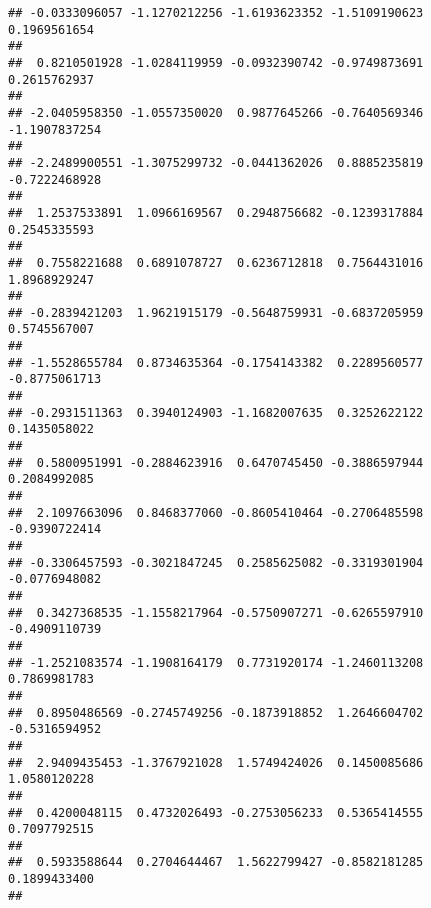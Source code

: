 \documentclass[]{article}
\begin{document}
\begin{verbatim}
## -0.0333096057 -1.1270212256 -1.6193623352 -1.5109190623  0.1969561654 
##                                                                       
##  0.8210501928 -1.0284119959 -0.0932390742 -0.9749873691  0.2615762937 
##                                                                       
## -2.0405958350 -1.0557350020  0.9877645266 -0.7640569346 -1.1907837254 
##                                                                       
## -2.2489900551 -1.3075299732 -0.0441362026  0.8885235819 -0.7222468928 
##                                                                       
##  1.2537533891  1.0966169567  0.2948756682 -0.1239317884  0.2545335593 
##                                                                       
##  0.7558221688  0.6891078727  0.6236712818  0.7564431016  1.8968929247 
##                                                                       
## -0.2839421203  1.9621915179 -0.5648759931 -0.6837205959  0.5745567007 
##                                                                       
## -1.5528655784  0.8734635364 -0.1754143382  0.2289560577 -0.8775061713 
##                                                                       
## -0.2931511363  0.3940124903 -1.1682007635  0.3252622122  0.1435058022 
##                                                                       
##  0.5800951991 -0.2884623916  0.6470745450 -0.3886597944  0.2084992085 
##                                                                       
##  2.1097663096  0.8468377060 -0.8605410464 -0.2706485598 -0.9390722414 
##                                                                       
## -0.3306457593 -0.3021847245  0.2585625082 -0.3319301904 -0.0776948082 
##                                                                       
##  0.3427368535 -1.1558217964 -0.5750907271 -0.6265597910 -0.4909110739 
##                                                                       
## -1.2521083574 -1.1908164179  0.7731920174 -1.2460113208  0.7869981783 
##                                                                       
##  0.8950486569 -0.2745749256 -0.1873918852  1.2646604702 -0.5316594952 
##                                                                       
##  2.9409435453 -1.3767921028  1.5749424026  0.1450085686  1.0580120228 
##                                                                       
##  0.4200048115  0.4732026493 -0.2753056233  0.5365414555  0.7097792515 
##                                                                       
##  0.5933588644  0.2704644467  1.5622799427 -0.8582181285  0.1899433400 
##                                                                       

\end{verbatim}
\end{document}
